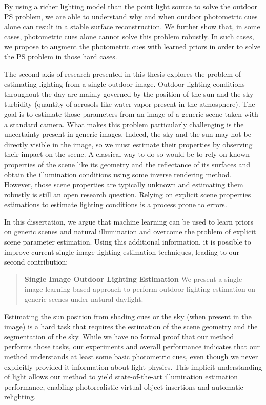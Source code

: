 By using a richer lighting model than the point light source to solve the outdoor PS problem, we are able to understand why and when outdoor photometric cues alone can result in a stable surface reconstruction. We further show that, in some cases, photometric cues alone cannot solve this problem robustly. In such cases, we propose to augment the photometric cues with learned priors in order to solve the PS problem in those hard cases. 

The second axis of research presented in this thesis explores the problem of estimating lighting from a single outdoor image. Outdoor lighting conditions throughout the day are mainly governed by the position of the sun and the sky turbidity (quantity of aerosols like water vapor present in the atmosphere). The goal is to estimate those parameters from an image of a generic scene taken with a standard camera. What makes this problem particularly challenging is the uncertainty present in generic images. Indeed, the sky and the sun may not be directly visible in the image, so we must estimate their properties by observing their impact on the scene. A classical way to do so would be to rely on known properties of the scene like its geometry and the reflectance of its surfaces and obtain the illumination conditions using some inverse rendering method. However, those scene properties are typically unknown and estimating them robustly is still an open research question. Relying on explicit scene properties estimations to estimate lighting conditions is a process prone to errors. 

In this dissertation, we argue that machine learning can be used to learn priors on generic scenes and natural illumination and overcome the problem of explicit scene parameter estimation. Using this additional information, it is possible to improve current single-image lighting estimation techniques, leading to our second contribution: 

\begin{quotation}
\textbf{Single Image Outdoor Lighting Estimation} We present a single-image learning-based approach to perform outdoor lighting estimation on generic scenes under natural daylight. 
\end{quotation}

Estimating the sun position from shading cues or the sky (when present in the image) is a hard task that requires the estimation of the scene geometry and the segmentation of the sky. While we have no formal proof that our method performs those tasks, our experiments and overall performance indicates that our method understands at least some basic photometric cues, even though we never explicitly provided it information about light physics. This implicit understanding of light allows our method to yield state-of-the-art illumination estimation performance, enabling photorealistic virtual object insertions and automatic relighting.

